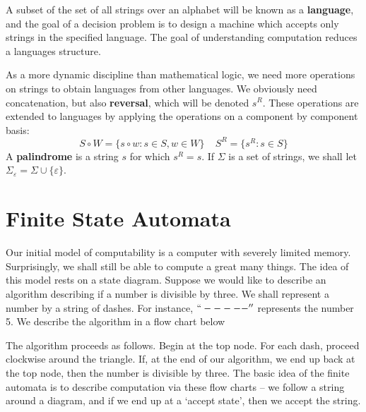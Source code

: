 A subset of the set of all strings over an alphabet will be known as a {\bf language}, and the goal of a decision problem is to design a machine which accepts only strings in the specified language. The goal of understanding computation reduces a languages structure.

As a more dynamic discipline than mathematical logic, we need more operations on strings to obtain languages from other languages. We obviously need concatenation, but also {\bf reversal}, which will be denoted $s^R$. These operations are extended to languages by applying the operations on a component by component basis:
%
\[ S \circ W = \{ s \circ w : s \in S, w \in W \}\ \ \ \ \ S^R = \{ s^R : s \in S \} \]
%
A {\bf palindrome} is a string $s$ for which $s^R = s$. If $\Sigma$ is a set of strings, we shall let $\Sigma_\varepsilon = \Sigma \cup \{ \varepsilon \}$.



\chapter{Finite State Automata}

Our initial model of computability is a computer with severely limited memory. Surprisingly, we shall still be able to compute a great many things. The idea of this model rests on a state diagram. Suppose we would like to describe an algorithm describing if a number is divisible by three. We shall represent a number by a string of dashes. For instance, $``-----''$ represents the number 5. We describe the algorithm in a flow chart below
%
\begin{center}
\end{center}
%
The algorithm proceeds as follows. Begin at the top node. For each dash, proceed clockwise around the triangle. If, at the end of our algorithm, we end up back at the top node, then the number is divisible by three. The basic idea of the finite automata is to describe computation via these flow charts -- we follow a string around a diagram, and if we end up at a `accept state', then we accept the string.

